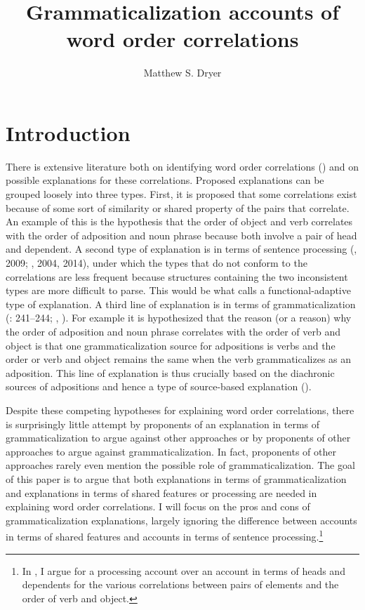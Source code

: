 \documentclass[output=paper]{langsci/langscibook}
\author{Matthew S. Dryer\affiliation{University at Buffalo}}
\title{Grammaticalization accounts of word order correlations}
\begin{document}
\maketitle 

\section{Introduction}

There is extensive literature both on identifying word order correlations (\citealt{Greenberg1963,Hawkins1983,Dryer1992}) and on possible explanations for these correlations. Proposed explanations can be grouped loosely into three types. First, it is proposed that some correlations exist because of some sort of similarity or shared property of the pairs that correlate. An example of this is the hypothesis that the order of object and verb correlates with the order of adposition and noun phrase because both involve a pair of head and dependent. A second type of explanation is in terms of sentence processing (\citealt{Kuno1974,Dryer1992}, 2009; \citealt{Hawkins1994}, 2004, 2014), under which the types that do not conform to the correlations are less frequent because structures containing the two inconsistent types are more difficult to parse. This would be what  calls a functional-adaptive type of explanation. A third line of explanation is in terms of grammaticalization (\citealt{Givón1979,HeineReh1984}: 241–244; \citealt{Bybee1988,Aristar1991,DeLancey1994,Collins2012}, ). For example it is hypothesized that the reason (or a reason) why the order of adposition and noun phrase correlates with the order of verb and object is that one grammaticalization source for adpositions is verbs and the order or verb and object remains the same when the verb grammaticalizes as an adposition. This line of explanation is thus crucially based on the diachronic sources of adpositions and hence a type of source-based explanation ().

Despite these competing hypotheses for explaining word order correlations, there is surprisingly little attempt by proponents of an explanation in terms of grammaticalization to argue against other approaches or by proponents of other approaches to argue against grammaticalization. In fact, proponents of other approaches rarely even mention the possible role of grammaticalization. The goal of this paper is to argue that both explanations in terms of grammaticalization and explanations in terms of shared features or processing are needed in explaining word order correlations. I will focus on the pros and cons of grammaticalization explanations, largely ignoring the difference between accounts in terms of shared features and accounts in terms of sentence processing.\footnote{In \citet{Dryer1992}, I argue for a processing account over an account in terms of heads and dependents for the various correlations between pairs of elements and the order of verb and object.}
\end{document}

